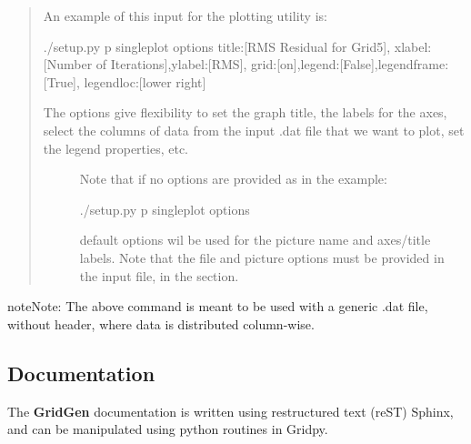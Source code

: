 \documentclass[letterpaper,10pt,english]{sphinxmanual}
\begin{document}
\begin{quote}

An example of this input for the plotting utility is:

\begin{sphinxVerbatim}[commandchars=\\\{\}]
\PYGZdl{} ./setup.py \PYGZhy{}p single\PYGZus{}plot options \PYGZdq{}\PYGZob{}\PYGZsq{}title\PYGZsq{}:[\PYGZsq{}RMS Residual for Grid\PYGZsh{}5\PYGZsq{}],
  \PYGZsq{}xlabel\PYGZsq{}:[\PYGZsq{}Number of Iterations\PYGZsq{}],\PYGZsq{}ylabel\PYGZsq{}:[\PYGZsq{}RMS\PYGZsq{}],
  \PYGZsq{}grid\PYGZsq{}:[\PYGZsq{}on\PYGZsq{}],\PYGZsq{}legend\PYGZsq{}:[\PYGZsq{}False\PYGZsq{}],\PYGZsq{}legend\PYGZus{}frame\PYGZsq{}:[\PYGZsq{}True\PYGZsq{}],
  \PYGZsq{}legend\PYGZus{}loc\PYGZsq{}:[\PYGZsq{}lower right\PYGZsq{}]\PYGZcb{}\PYGZdq{}
\end{sphinxVerbatim}
\begin{description}
\item[{The options give flexibility to set the graph title, the labels for the axes, select the columns of data from the input .dat file that we want to plot, set the legend properties, etc.}] \leavevmode
Note that if no options are provided as in the example:

\begin{sphinxVerbatim}[commandchars=\\\{\}]
\PYGZdl{} ./setup.py \PYGZhy{}p single\PYGZus{}plot options
\end{sphinxVerbatim}

default options wil be used for the picture name and axes/title labels.
Note that the file and picture options must be provided in the input file,
in the  section.

\end{description}
\end{quote}

\begin{sphinxadmonition}{note}{Note:}
The above command is meant to be used with a generic .dat file, without header, where data is distributed column-wise.
\end{sphinxadmonition}


\subsection{Documentation}
\label{\detokenize{gridpyfiles/documentation:documentation}}\label{\detokenize{gridpyfiles/documentation::doc}}\label{\detokenize{gridpyfiles/documentation:id1}}
The {\color{red}\bfseries{}\textbar{}GridGen\textbar{}} documentation is written using restructured text (reST) Sphinx, and can be manipulated using python routines in Gridpy.
\end{document}
